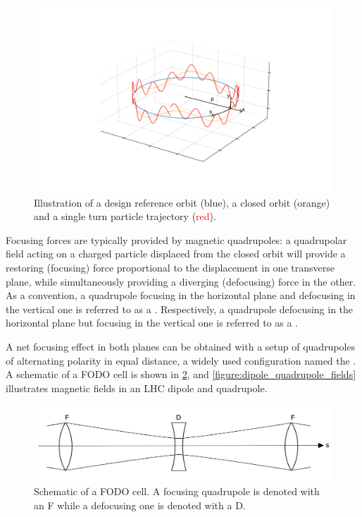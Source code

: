 \begin{figure}[!htb]
    \centering
    \includegraphics[width=0.95\linewidth]{Figures/Beam_Dynamics_Theory/design_vs_closed_vs_particle_orbit.pdf}
    \caption{Illustration of a design reference orbit (\textcolor{mplblue}{blue}), a closed orbit (\textcolor{mplorange}{orange}) and a single turn particle trajectory (\textcolor{red}{red}).}
    \label{figure:design_vs_particle_orbit}
\end{figure}

Focusing forces are typically provided by magnetic quadrupoles: a quadrupolar field acting on a charged particle displaced from the closed orbit will provide a restoring (focusing) force proportional to the displacement in one transverse plane, while simultaneously providing a diverging (defocusing) force in the other. 
As a convention, a quadrupole focusing in the horizontal plane and defocusing in the vertical one is referred to as a . 
Respectively, a quadrupole defocusing in the horizontal plane but focusing in the vertical one is referred to as a .

A net focusing effect in both planes can be obtained with a setup of quadrupoles of alternating polarity in equal distance, a widely used configuration named the .
A schematic of a FODO cell is shown in \cref{figure:fodo_cell_schematic}, and \cref{figure:dipole_quadrupole_fields} illustrates magnetic fields in an \gls{LHC} dipole and quadrupole.

\begin{figure}[!htb]
    \centering
    \includegraphics[width=\linewidth]{Figures/Beam_Dynamics_Theory/fodo_cell_schematic.png}
    \caption{Schematic of a FODO cell. A focusing quadrupole is denoted with an F while a defocusing one is denoted with a D.}
    \label{figure:fodo_cell_schematic}
\end{figure}

